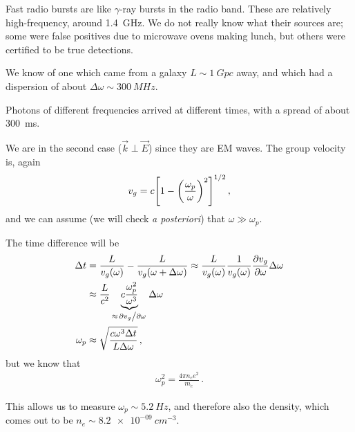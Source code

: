\documentclass[main.tex]{subfiles}
\begin{document}
Fast radio bursts are like \(\gamma \)-ray bursts in the radio band.
These are relatively high-frequency, around \SI{1.4}{GHz}. 
We do not really know what their sources are; some were false positives due to microwave ovens making lunch, but others were certified to be true detections.

We know of one which came from a galaxy \(L \sim \SI{1}{Gpc}\) away, and which had a dispersion of about \(\Delta \omega \sim \SI{300}{MHz}\). 

Photons of different frequencies arrived at different times, with a spread of about \SI{300}{ms}. 

We are in the second case (\(\vec{k} \perp \vec{E}\)) since they are EM waves. 
The group velocity is, again
%
\begin{align}
v_g = c \qty[ 1 - \qty(\frac{\omega _p}{\omega})^2]^{1/2}
\,,
\end{align}
%
and we can assume (we will check \emph{a posteriori}) that \(\omega \gg \omega _p\). 

The time difference will be 
%
\begin{subequations}
\begin{align}
\Delta t &= \frac{L}{v_g (\omega)} - \frac{L}{v_g (\omega + \Delta \omega )} 
\approx \frac{L}{v_g(\omega )} \frac{1}{v_g(\omega )}\pdv{v_g}{\omega } \Delta \omega  \\
&\approx \frac{L}{c^2} \underbrace{c \frac{\omega _p^2}{\omega^3}}_{\approx \pdv*{v_g}{\omega }} \Delta \omega \\
\omega _p &\approx \sqrt{\frac{ c \omega^3 \Delta t}{L \Delta \omega }}
\,,
\end{align}
\end{subequations}
%
but we know that 
%
\begin{align}
\omega _p^2 = \frac{ 4 \pi n_e e^2}{m_e}
\,.
\end{align}

This allows us to measure \(\omega _p \sim \SI{5.2}{Hz}\), and therefore also the density, which comes out to be \(n_e \sim \SI{8.2e-09}{cm^{-3}}\).
\end{document}

